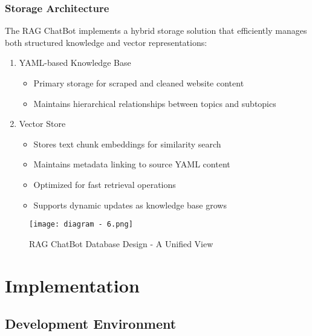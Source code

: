 \documentclass[12pt,a4paper]{report}
\begin{document}
\subsection{Storage Architecture }
The RAG ChatBot implements a hybrid storage solution that efficiently manages both structured knowledge and vector representations:
\begin{enumerate}
    \item YAML-based Knowledge Base
\begin{itemize}
    \item Primary storage for scraped and cleaned website content
    \item Maintains hierarchical relationships between topics and subtopics
\end{itemize}

\item Vector Store
\begin{itemize}
    \item Stores text chunk embeddings for similarity search
     \item Maintains metadata linking to source YAML content
      \item Optimized for fast retrieval operations
        \item Supports dynamic updates as knowledge base grows
\end{itemize}
\end{enumerate}




\begin{figure}[htbp]
    \centering
    \texttt{[image: diagram - 6.png]}
    \caption{RAG ChatBot Database Design - A Unified View}
    \label{fig:database-design}
\end{figure}

\chapter{Implementation}
\section{Development Environment}
\end{document}
